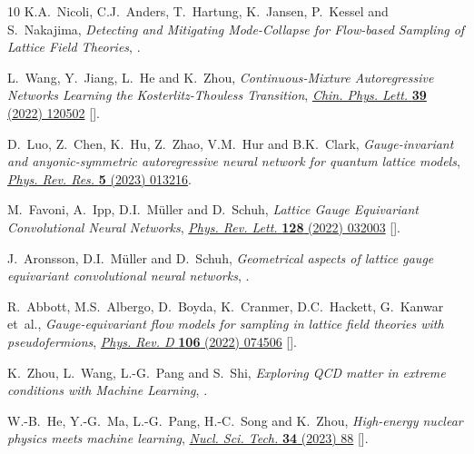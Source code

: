 \begin{thebibliography}{10}
K.A.~Nicoli, C.J.~Anders, T.~Hartung, K.~Jansen, P.~Kessel and S.~Nakajima,
  \emph{{Detecting and Mitigating Mode-Collapse for Flow-based Sampling of
  Lattice Field Theories}},  \href{https://arxiv.org/abs/2302.14082}{{}}.

L.~Wang, Y.~Jiang, L.~He and K.~Zhou, \emph{{Continuous-Mixture Autoregressive
  Networks Learning the Kosterlitz-Thouless Transition}},
  \href{https://doi.org/10.1088/0256-307X/39/12/120502}{\emph{Chin. Phys.
  Lett.} {\bfseries 39} (2022) 120502}
  [\href{https://arxiv.org/abs/2005.04857}{{}}].

D.~Luo, Z.~Chen, K.~Hu, Z.~Zhao, V.M.~Hur and B.K.~Clark,
  \emph{{Gauge-invariant and anyonic-symmetric autoregressive neural network
  for quantum lattice models}},
  \href{https://doi.org/10.1103/PhysRevResearch.5.013216}{\emph{Phys. Rev.
  Res.} {\bfseries 5} (2023) 013216}.

M.~Favoni, A.~Ipp, D.I.~M{\"u}ller and D.~Schuh, \emph{Lattice {{Gauge
  Equivariant Convolutional Neural Networks}}},
  \href{https://doi.org/10.1103/PhysRevLett.128.032003}{\emph{Phys. Rev. Lett.}
  {\bfseries 128} (2022) 032003}
  [\href{https://arxiv.org/abs/2012.12901}{{}}].

J.~Aronsson, D.I.~M\"uller and D.~Schuh, \emph{{Geometrical aspects of lattice
  gauge equivariant convolutional neural networks}},
  \href{https://arxiv.org/abs/2303.11448}{{}}.

R.~Abbott, M.S.~Albergo, D.~Boyda, K.~Cranmer, D.C.~Hackett, G.~Kanwar et~al.,
  \emph{Gauge-equivariant flow models for sampling in lattice field theories
  with pseudofermions},
  \href{https://doi.org/10.1103/PhysRevD.106.074506}{\emph{Phys. Rev. D}
  {\bfseries 106} (2022) 074506}
  [\href{https://arxiv.org/abs/2207.08945}{{}}].

K.~Zhou, L.~Wang, L.-G.~Pang and S.~Shi, \emph{{Exploring QCD matter in extreme
  conditions with Machine Learning}},
  \href{https://arxiv.org/abs/2303.15136}{{}}.

W.-B.~He, Y.-G.~Ma, L.-G.~Pang, H.-C.~Song and K.~Zhou, \emph{{High-energy
  nuclear physics meets machine learning}},
  \href{https://doi.org/10.1007/s41365-023-01233-z}{\emph{Nucl. Sci. Tech.}
  {\bfseries 34} (2023) 88} [\href{https://arxiv.org/abs/2303.06752}{{}}].


\end{thebibliography}
